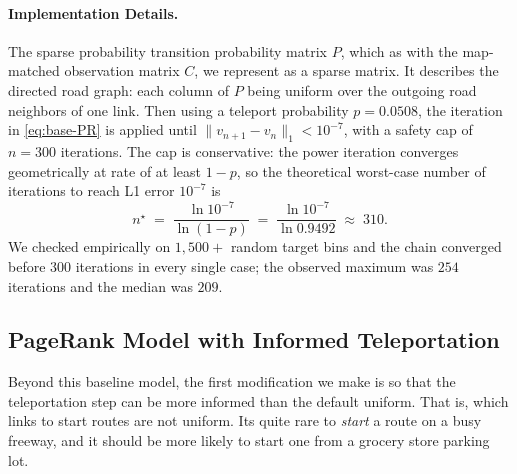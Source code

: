 \documentclass[sigconf, review]{acmart}
\begin{document}
\paragraph{Implementation Details.}
The sparse probability transition probability matrix $P$, which as with the map-matched observation matrix $C$, we represent as a sparse matrix.  It describes the directed road graph: each column of $P$ being uniform over the outgoing road neighbors of one link.  Then using a teleport
probability $p = 0.0508$, the iteration in \eqref{eq:base-PR} is applied until 
$\|v_{n+1} - v_n\|_1 < 10^{-7}$, 
with a safety cap of $n=300$ iterations. The cap is conservative: the power
iteration converges geometrically at rate of at least $1 - p$, so the
theoretical worst-case number of iterations to reach L1 error
$10^{-7}$ is
\[
n^{\star} \;=\; \frac{\ln 10^{-7}}{\ln (1 - p)}
\;=\; \frac{\ln 10^{-7}}{\ln 0.9492} \;\approx\; 310.
\]
We checked empirically on $1{,}500+$ random target bins and the chain converged before $300$ iterations
in every single case; the observed maximum was $254$ iterations and the median was $209$.



\subsection{PageRank Model with Informed Teleportation}
\label{sec:informed-tele}
Beyond this baseline model, the first modification we make is so that the teleportation step can be more informed than the default uniform.  That is, which links to start routes are not uniform.  Its quite rare to \emph{start} a route on a busy freeway, and it should be more likely to start one from a grocery store parking lot.  
\end{document}
